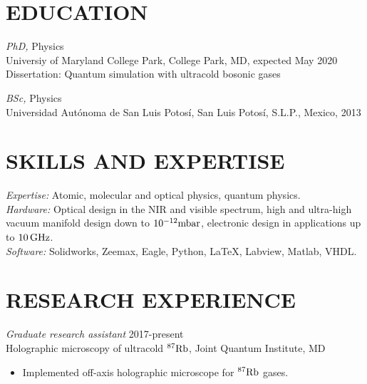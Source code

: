 \documentclass[margin, 10pt]{res} %
\begin{document}
\begin{resume}


\section{EDUCATION}

{\sl PhD,} Physics \\
Universiy of Maryland College Park, College Park, MD, expected May 2020 \\
Dissertation: Quantum simulation with ultracold bosonic gases

{\sl BSc,} Physics \\
Universidad Aut\'onoma de San Luis Potos\'i, San Luis Potos\'i, S.L.P., Mexico, 2013
 

\section{SKILLS AND EXPERTISE}

{\sl Expertise:}
Atomic, molecular and optical physics, quantum physics.\\
{\sl Hardware:}
Optical design in the NIR and visible spectrum, high and ultra-high vacuum manifold design down to ${10^{-12} {\rm mbar}}$, electronic design in applications up to ${10 \, {\rm GHz}}$.\\
{\sl Software:}
Solidworks, Zeemax, Eagle, Python, \LaTeX, Labview, Matlab, VHDL.

 
\section{RESEARCH EXPERIENCE}

{\sl Graduate research assistant} \hfill 2017-present \\
Holographic microscopy of ultracold ${^{87} {\rm Rb}}$, Joint Quantum Institute, MD
\begin{itemize} \itemsep -2pt
\item Implemented off-axis holographic microscope for ${^{87} {\rm Rb}}$ gases.
\end{itemize} 


\end{resume}
\end{document}
